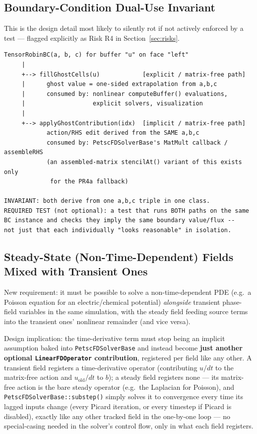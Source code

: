 \documentclass[11pt]{article}
\newenvironment{schematic}{%
  \begin{tcolorbox}[breakable, colback=codebg, colframe=gray!40, boxrule=0.4pt, arc=1mm, left=4mm, right=4mm, top=2mm, bottom=2mm]
  \ttfamily\footnotesize
}{%
  \end{tcolorbox}
}
\begin{document}
\subsection{Boundary-Condition Dual-Use Invariant}

This is the design detail most likely to silently rot if not actively
enforced by a test --- flagged explicitly as Risk R4 in
Section~\ref{sec:risks}.

\begin{schematic}
\begin{verbatim}
TensorRobinBC(a, b, c) for buffer "u" on face "left"
     |
     +--> fillGhostCells(u)            [explicit / matrix-free path]
     |      ghost value = one-sided extrapolation from a,b,c
     |      consumed by: nonlinear computeBuffer() evaluations,
     |                   explicit solvers, visualization
     |
     +--> applyGhostContribution(idx)  [implicit / matrix-free path]
            action/RHS edit derived from the SAME a,b,c
            consumed by: PetscFDSolverBase's MatMult callback / assembleRHS
            (an assembled-matrix stencilAt() variant of this exists only
             for the PR4a fallback)

INVARIANT: both derive from one a,b,c triple in one class.
REQUIRED TEST (not optional): a test that runs BOTH paths on the same
BC instance and checks they imply the same boundary value/flux --
not just that each individually "looks reasonable" in isolation.
\end{verbatim}
\end{schematic}

\subsection{Steady-State (Non-Time-Dependent) Fields Mixed with Transient Ones}
\label{sec:steady-mixing}

New requirement: it must be possible to solve a non-time-dependent PDE
(e.g.\ a Poisson equation for an electric/chemical potential)
\textit{alongside} transient phase-field variables in the same simulation,
with the steady field feeding source terms into the transient ones'
nonlinear remainder (and vice versa).

Design implication: the time-derivative term must stop being an implicit
assumption baked into \texttt{PetscFDSolverBase} and instead become
\textbf{just another optional \texttt{LinearFDOperator} contribution},
registered per field like any other. A transient field registers a
time-derivative operator (contributing $u/dt$ to the matrix-free action and
$u_{\text{old}}/dt$ to $b$); a steady field registers none --- its
matrix-free action is the bare steady operator (e.g.\ the Laplacian for
Poisson), and \texttt{PetscFDSolverBase::substep()} simply solves it to
convergence every time its lagged inputs change (every Picard iteration, or
every timestep if Picard is disabled), exactly like any other tracked field
in the one-by-one loop --- no special-casing needed in the solver's control
flow, only in what each field registers.
\end{document}
